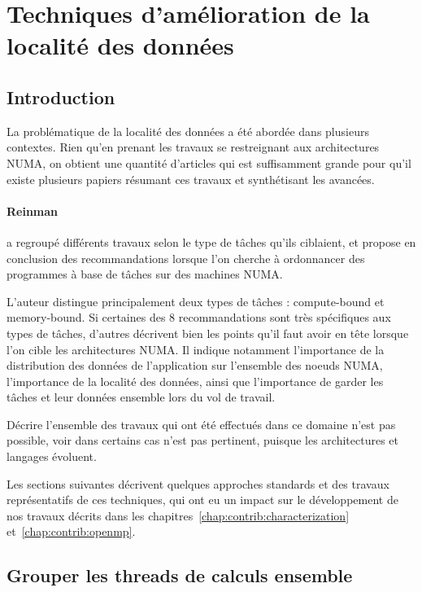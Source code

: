 \section{Techniques d'amélioration de la localité des données}\label{sec:rw:numa}

\subsection{Introduction}

La problématique de la localité des données a été abordée dans plusieurs contextes.
Rien qu'en prenant les travaux se restreignant aux architectures NUMA, on obtient une quantité d'articles qui est suffisamment grande pour qu'il existe plusieurs papiers résumant ces travaux et synthétisant les avancées.

\paragraph{Reinman~\cite{Reinman2015}} a regroupé différents travaux selon le type de tâches qu'ils ciblaient, et propose en conclusion des recommandations lorsque l'on cherche à ordonnancer des programmes à base de tâches sur des machines NUMA.

L'auteur distingue principalement deux types de tâches : compute-bound et memory-bound.
Si certaines des 8 recommandations sont très spécifiques aux types de tâches, d'autres décrivent bien les points qu'il faut avoir en tête lorsque l'on cible les architectures NUMA.
Il indique notamment l'importance de la distribution des données de l'application sur l'ensemble des noeuds NUMA, l'importance de la localité des données, ainsi que l'importance de garder les tâches et leur données ensemble lors du vol de travail.



Décrire l'ensemble des travaux qui ont été effectués dans ce domaine n'est pas possible, voir dans certains cas n'est pas pertinent, puisque les architectures et langages évoluent.

Les sections suivantes décrivent quelques approches standards et des travaux représentatifs de ces techniques, qui ont eu un impact sur le développement de nos travaux décrits dans les chapitres~\ref{chap:contrib:characterization} et~\ref{chap:contrib:openmp}.



\subsection{Grouper les threads de calculs ensemble}

